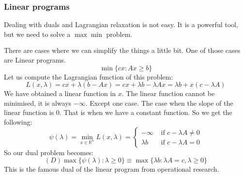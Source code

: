 \subsubsection{Linear programs}
\par Dealing with duals and Lagrangian relaxation is not easy. It is a powerful tool, but we need to solve a $\max \min$ problem.
\par There are cases where we can simplify the things a little bit. One of those cases are Linear programs.
\begin{equation}
    \min\{cx : Ax \geq b\}
\end{equation}
Let us compute the Lagrangian function of this problem:
\begin{equation}
    L(x,\lambda) = cx + \lambda(b-Ax) = cx + \lambda b - \lambda Ax = \lambda b + x(c - \lambda A)
\end{equation}
We have obtained a linear function in $x$. The linear function cannot be minimised, it is always $-\infty$. Except one case. The case when the slope of the linear function is 0. That is when we have a constant function. So we get the following:
\begin{equation}
    \psi(\lambda) = \min_{x \in \mathbb{R}^n} L(x,\lambda) =
    \begin{cases}
        -\infty & \mbox{ if } c - \lambda A \neq 0\\
        \lambda b & \mbox{ if } c - \lambda A = 0
    \end{cases}
\end{equation}
So our dual problem becomes:
\begin{equation}
    (D) \max \{\psi(\lambda) : \lambda \geq 0\} \equiv \max \{\lambda b : \lambda A = c, \lambda \geq 0\}
\end{equation}
This is the famous dual of the linear program from operational research.
%
